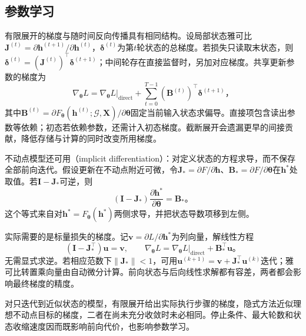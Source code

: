 \subsection{参数学习}
\label{sec:gnn-recurrent-learning}

有限展开的梯度与随时间反向传播具有相同结构。设局部状态雅可比$\bm{J}^{(t)}=\partial\bm{h}^{(t+1)}/\partial\bm{h}^{(t)}$，$\bm{\delta}^{(t)}$为第$t$轮状态的总梯度。若损失只读取末状态，则$\bm{\delta}^{(t)}=(\bm{J}^{(t)})^{\top}\bm{\delta}^{(t+1)}$；中间轮存在直接监督时，另加对应梯度。共享更新参数的梯度为
\begin{equation}
  \nabla_{\bm{\theta}}L
    =\left.\nabla_{\bm{\theta}}L\right|_{\mathrm{direct}}
      +\sum_{t=0}^{T-1}(\bm{B}^{(t)})^{\top}\bm{\delta}^{(t+1)}\text{，}
  \label{eq:gnn-recurrent-gradient}
\end{equation}
其中$\bm{B}^{(t)}=\partial F_{\bm{\theta}}(\bm{h}^{(t)};\mathcal{G},\bm{X})/\partial\bm{\theta}$固定当前输入状态求偏导。直接项包含读出参数等依赖；初态若依赖参数，还需计入初态梯度。截断展开会遗漏更早的间接贡献，降低存储与计算的同时改变所用梯度。

不动点模型还可用（implicit differentiation）：对定义状态的方程求导，而不保存全部前向迭代。假设更新在不动点附近可微，令$\bm{J}_*=\partial F/\partial\bm{h}$、$\bm{B}_*=\partial F/\partial\bm{\theta}$在$\bm{h}^*$处取值。若$\bm{I}-\bm{J}_*$可逆，则
\begin{equation}
  (\bm{I}-\bm{J}_*)\frac{\partial\bm{h}^*}{\partial\bm{\theta}}
    =\bm{B}_*\text{。}
  \label{eq:gnn-implicit-state-gradient}
\end{equation}
这个等式来自对$\bm{h}^*=F_{\bm{\theta}}(\bm{h}^*)$两侧求导，并把状态导数项移到左侧。

实际需要的是标量损失的梯度。记$\bm{v}=\partial L/\partial\bm{h}^*$为列向量，解线性方程
\begin{equation}
  (\bm{I}-\bm{J}_*^{\top})\bm{u}=\bm{v},\qquad
  \nabla_{\bm{\theta}}L
    =\left.\nabla_{\bm{\theta}}L\right|_{\mathrm{direct}}+\bm{B}_*^{\top}\bm{u}\text{。}
  \label{eq:gnn-implicit-loss-gradient}
\end{equation}
无需显式求逆。若相应范数下$\lVert\bm{J}_*\rVert<1$，可用$\bm{u}^{(k+1)}=\bm{v}+\bm{J}_*^{\top}\bm{u}^{(k)}$迭代；雅可比转置乘向量由自动微分计算。前向状态与后向线性求解都有容差，两者都会影响最终梯度的精度。

对只迭代到近似状态的模型，有限展开给出实际执行步骤的梯度，隐式方法近似理想不动点目标的梯度，二者在尚未充分收敛时未必相同。停止条件、最大轮数和状态收缩速度因而既影响前向代价，也影响参数学习。

